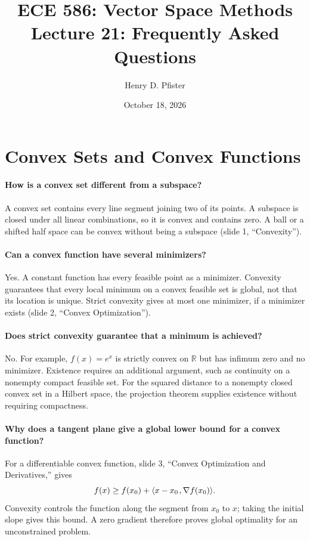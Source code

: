 \documentclass[10pt,english]{article}
\begin{document}
\title{ECE 586: Vector Space Methods \\ Lecture 21: Frequently Asked Questions}
\author{Henry D. Pfister \\ \univ}
\date{October 18, 2026}

\maketitle

\section{Convex Sets and Convex Functions}

\paragraph{How is a convex set different from a subspace?}
A convex set contains every line segment joining two of its points.
A subspace is closed under all linear combinations, so it is convex and contains zero.
A ball or a shifted half space can be convex without being a subspace (slide 1, ``Convexity'').

\paragraph{Can a convex function have several minimizers?}
Yes. A constant function has every feasible point as a minimizer.
Convexity guarantees that every local minimum on a convex feasible set is global, not that its location is unique.
Strict convexity gives at most one minimizer, if a minimizer exists (slide 2, ``Convex Optimization'').

\paragraph{Does strict convexity guarantee that a minimum is achieved?}
No. For example, $f(x)=e^x$ is strictly convex on $\mathbb{R}$ but has infimum zero and no minimizer.
Existence requires an additional argument, such as continuity on a nonempty compact feasible set.
For the squared distance to a nonempty closed convex set in a Hilbert space, the projection theorem supplies existence without requiring compactness.

\paragraph{Why does a tangent plane give a global lower bound for a convex function?}
For a differentiable convex function, slide 3, ``Convex Optimization and Derivatives,'' gives
\[
f(x)\geq f(x_0)+{\left\langle x-x_0 \mskip2mu , \nabla f(x_0) \right\rangle}.
\]
Convexity controls the function along the segment from $x_0$ to $x$; taking the initial slope gives this bound.
A zero gradient therefore proves global optimality for an unconstrained problem.
\end{document}
